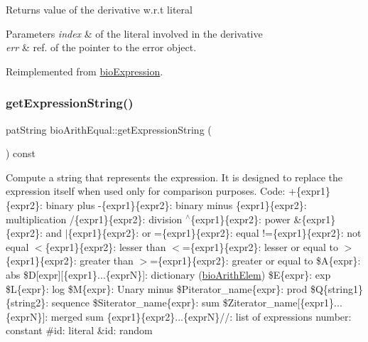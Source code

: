 \begin{DoxyReturn}{Returns}
value of the derivative w.\+r.\+t literal 
\end{DoxyReturn}

\begin{DoxyParams}{Parameters}
{\em index} & of the literal involved in the derivative \\
\hline
{\em err} & ref. of the pointer to the error object. \\
\hline
\end{DoxyParams}


Reimplemented from \hyperlink{classbio_expression_a5915579d1193f25f216c1e273c97f2ce}{bio\+Expression}.

\mbox{\label{classbio_arith_equal_a69839ab065a8bd3d9d0409fbd529c22e}} 
\subsubsection{\texorpdfstring{get\+Expression\+String()}{getExpressionString()}}
{\footnotesize\ttfamily pat\+String bio\+Arith\+Equal\+::get\+Expression\+String (\begin{DoxyParamCaption}{ }\end{DoxyParamCaption}) const\hspace{0.3cm}{\ttfamily [virtual]}}

Compute a string that represents the expression. It is designed to replace the expression itself when used only for comparison purposes. Code\+: +\{expr1\}\{expr2\}\+: binary plus -\/\{expr1\}\{expr2\}\+: binary minus \{expr1\}\{expr2\}\+: multiplication /\{expr1\}\{expr2\}\+: division $^\wedge$\{expr1\}\{expr2\}\+: power \&\{expr1\}\{expr2\}\+: and $\vert$\{expr1\}\{expr2\}\+: or =\{expr1\}\{expr2\}\+: equal !=\{expr1\}\{expr2\}\+: not equal $<$\{expr1\}\{expr2\}\+: lesser than $<$=\{expr1\}\{expr2\}\+: lesser or equal to $>$\{expr1\}\{expr2\}\+: greater than $>$=\{expr1\}\{expr2\}\+: greater or equal to \$A\{expr\}\+: abs \$D\mbox{[}expr\mbox{]}\mbox{[}\{expr1\}...\{exprN\}\mbox{]}\+: dictionary (\hyperlink{classbio_arith_elem}{bio\+Arith\+Elem}) \$E\{expr\}\+: exp \$L\{expr\}\+: log \$M\{expr\}\+: Unary minus \$\+Piterator\+\_\+name\{expr\}\+: prod \$Q\{string1\}\{string2\}\+: sequence \$\+Siterator\+\_\+name\{expr\}\+: sum \$\+Ziterator\+\_\+name\mbox{[}\{expr1\}...\{exprN\}\mbox{]}\+: merged sum \{expr1\}\{expr2\}...\{exprN\}//\+: list of expressions number\+: constant \#id\+: literal \&id\+: random 

